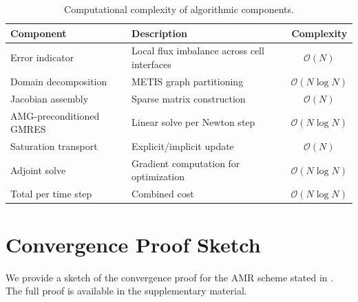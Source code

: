 \begin{table}[htbp]
    \centering
    \caption{Computational complexity of algorithmic components.}
    \label{tab:complexity}
    \begin{tabularx}{\textwidth}{@{}l X c@{}}
        \toprule
        \textbf{Component} & \textbf{Description} & \textbf{Complexity} \\
        \midrule
        Error indicator       & Local flux imbalance across cell interfaces & $\mathcal{O}(N)$ \\
        Domain decomposition  & METIS graph partitioning                    & $\mathcal{O}(N \log N)$ \\
        Jacobian assembly     & Sparse matrix construction                   & $\mathcal{O}(N)$ \\
        AMG-preconditioned GMRES & Linear solve per Newton step           & $\mathcal{O}(N \log N)$ \\
        Saturation transport  & Explicit/implicit update                     & $\mathcal{O}(N)$ \\
        Adjoint solve         & Gradient computation for optimization        & $\mathcal{O}(N \log N)$ \\
        Total per time step   & Combined cost                                & $\mathcal{O}(N \log N)$ \\
        \bottomrule
    \end{tabularx}
\end{table}

\section{Convergence Proof Sketch}
\label{sec:methodology:proof_sketch}

We provide a sketch of the convergence proof for the AMR scheme stated in . The full proof is available in the supplementary material.

